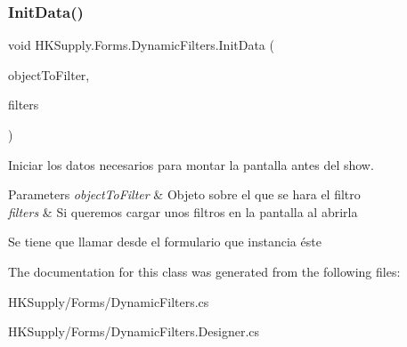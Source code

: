 \subsubsection{\texorpdfstring{Init\+Data()}{InitData()}}
{\footnotesize\ttfamily void H\+K\+Supply.\+Forms.\+Dynamic\+Filters.\+Init\+Data (\begin{DoxyParamCaption}\item[{object}]{object\+To\+Filter,  }\item[{List$<$ \mbox{\hyperlink{class_h_k_supply_1_1_forms_1_1_model_linq_filtering}{Model\+Linq\+Filtering}} $>$}]{filters }\end{DoxyParamCaption})}



Iniciar los datos necesarios para montar la pantalla antes del show. 


\begin{DoxyParams}{Parameters}
{\em object\+To\+Filter} & Objeto sobre el que se hara el filtro\\
\hline
{\em filters} & Si queremos cargar unos filtros en la pantalla al abrirla\\
\hline
\end{DoxyParams}


Se tiene que llamar desde el formulario que instancia éste

The documentation for this class was generated from the following files\+:\begin{DoxyCompactItemize}
\item 
H\+K\+Supply/\+Forms/Dynamic\+Filters.\+cs\item 
H\+K\+Supply/\+Forms/Dynamic\+Filters.\+Designer.\+cs\end{DoxyCompactItemize}

